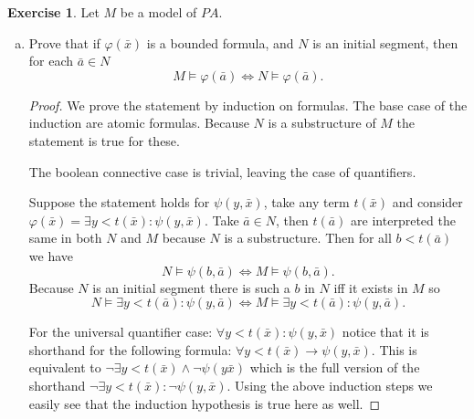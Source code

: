 \documentclass{article}
\theoremstyle{definition}
\newtheorem{question}{Exercise}
\begin{document}
\begin{question}
    Let \(M\) be a model of \(PA\).

    \begin{enumerate}[(a)]
        \item Prove that if \(\varphi(\bar{x})\) is a bounded
              formula, and \(N\) is an initial segment, then for each
              \(\bar{a}\in N\)
              \[
                  M\models\varphi(\bar{a})\Longleftrightarrow N\models\varphi(\bar{a}).
              \]

              \begin{proof}
                  We prove the statement by induction on formulas. The base case
                  of the induction are atomic formulas. Because \(N\) is a
                  substructure of \(M\) the statement is true for these.

                  The boolean connective case is trivial, leaving the case of
                  quantifiers.

                  Suppose the statement holds for \(\psi(y,\bar{x})\), take any
                  term \(t(\bar{x})\) and consider \(\varphi(\bar{x})=\exists
                  y<t(\bar{x}):\psi(y,\bar{x})\). Take \(\bar{a}\in N\), then
                  \(t(\bar{a})\) are interpreted the same in both \(N\) and
                  \(M\) because \(N\) is a substructure. Then for all
                  \(b<t(\bar{a})\) we have
                  \[
                      N\models\psi(b,\bar{a})\Longleftrightarrow M\models\psi(b,\bar{a}).
                  \]
                  Because \(N\) is an initial segment there is such a \(b\) in
                  \(N\) iff it exists in \(M\) so
                  \[
                      N\models\exists y<t(\bar{a}):\psi(y,\bar{a})\Longleftrightarrow M\models\exists y<t(\bar{a}):\psi(y,\bar{a}).
                  \]

                  For the universal quantifier case: \(\forall
                  y<t(\bar{x}):\psi(y,\bar{x})\) notice that it is shorthand for
                  the following formula: \(\forall
                  y<t(\bar{x})\to\psi(y,\bar{x})\). This is equivalent to
                  \(\neg\exists y<t(\bar{x})\wedge\neg\psi(y\bar{x})\) which is
                  the full version of the shorthand \(\neg\exists
                  y<t(\bar{x}):\neg\psi(y,\bar{x})\). Using the above induction
                  steps we easily see that the induction hypothesis is true here
                  as well.
              \end{proof}


\end{enumerate}
\end{question}
\end{document}
